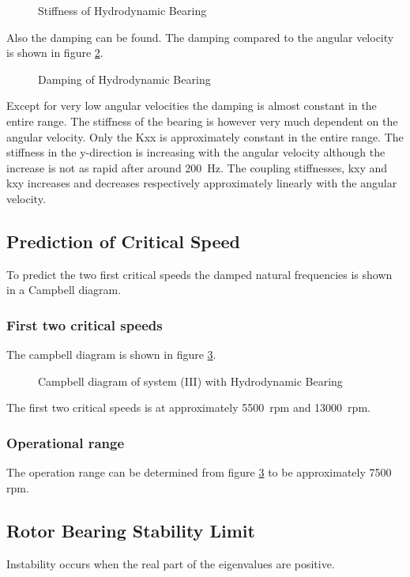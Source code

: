 \begin{figure}[ht]
    \centering
    
    \caption{Stiffness of Hydrodynamic Bearing}
    \label{fig:hydrodynamic_bearing_stiffness}
\end{figure}
Also the damping can be found. The damping compared to the angular velocity is shown in figure \ref{fig:hydrodynamic_bearing_damping}.
\begin{figure}[ht]
    \centering
    
    \caption{Damping of Hydrodynamic Bearing}
    \label{fig:hydrodynamic_bearing_damping}
\end{figure}
Except for very low angular velocities the damping is almost constant in the entire range. The stiffness of the bearing is however very much dependent on the angular velocity. Only the Kxx is approximately constant in the entire range. The stiffness in the y-direction is increasing with the angular velocity although the increase is not as rapid after around \SI{200}{\hertz}. The coupling stiffnesses, kxy and kxy increases and decreases respectively approximately linearly with the angular velocity.

\subsection{Prediction of Critical Speed}
To predict the two first critical speeds the damped natural frequencies is shown in a Campbell diagram.

\subsubsection{First two critical speeds}
The campbell diagram is shown in figure \ref{fig:hydrodynamic_bearing_campbell}.
\begin{figure}[ht]
    \centering
    
    \caption{Campbell diagram of system (III) with Hydrodynamic Bearing}
    \label{fig:hydrodynamic_bearing_campbell}
\end{figure}
The first two critical speeds is at approximately \SI{5500}{rpm} and \SI{13000}{rpm}.


\subsubsection{Operational range}
The operation range can be determined from figure \ref{fig:hydrodynamic_bearing_campbell} to be approximately 7500 rpm.

\subsection{Rotor Bearing Stability Limit}
Instability occurs when the real part of the eigenvalues are positive.


